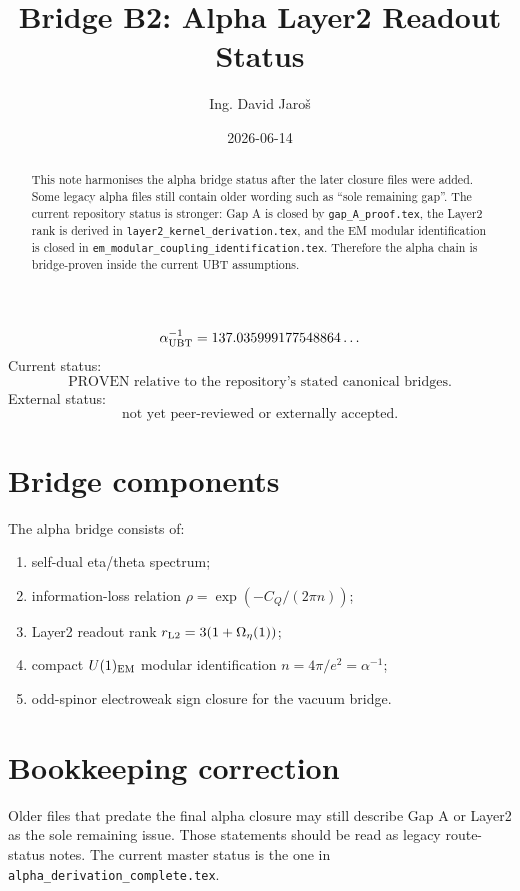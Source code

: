 \documentclass[12pt,a4paper]{article}
\title{Bridge B2: Alpha Layer2 Readout Status}
\author{Ing. David Jaroš}
\date{2026-06-14}
\begin{document}
\maketitle

\begin{abstract}
This note harmonises the alpha bridge status after the later closure files were
added.  Some legacy alpha files still contain older wording such as ``sole
remaining gap''.  The current repository status is stronger: Gap A is closed by
\texttt{gap\_A\_proof.tex}, the Layer2 rank is derived in
\texttt{layer2\_kernel\_derivation.tex}, and the EM modular identification is
closed in \texttt{em\_modular\_coupling\_identification.tex}.  Therefore the
alpha chain is bridge-proven inside the current UBT assumptions.
\end{abstract}

\begin{statusbox}
\[
  \alpha^{-1}_{\rm UBT}=137.035999177548864\ldots
\]
Current status:
\[
  \text{PROVEN relative to the repository's stated canonical bridges.}
\]
External status:
\[
  \text{not yet peer-reviewed or externally accepted.}
\]
\end{statusbox}

\section{Bridge components}

The alpha bridge consists of:
\begin{enumerate}
  \item self-dual eta/theta spectrum;
  \item information-loss relation $\rho=\exp(-C_Q/(2\pi n))$;
  \item Layer2 readout rank $r_{\rm L2}=3(1+\Omega_\eta(1))$;
  \item compact $U(1)_{\rm EM}$ modular identification
  $n=4\pi/e^2=\alpha^{-1}$;
  \item odd-spinor electroweak sign closure for the vacuum bridge.
\end{enumerate}

\section{Bookkeeping correction}

Older files that predate the final alpha closure may still describe Gap A or
Layer2 as the sole remaining issue.  Those statements should be read as legacy
route-status notes.  The current master status is the one in
\texttt{alpha\_derivation\_complete.tex}.
\end{document}
